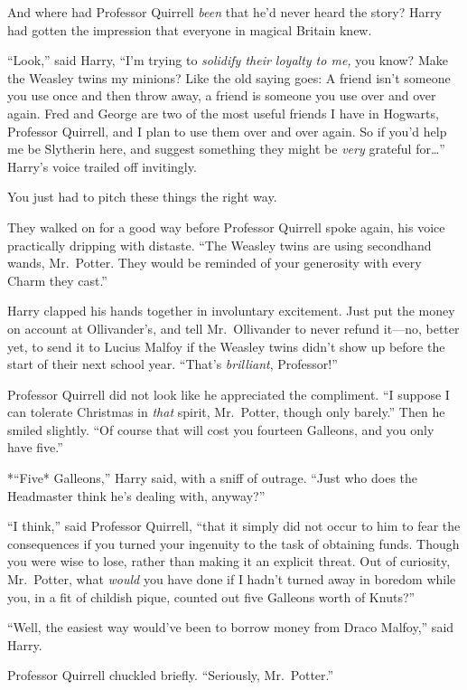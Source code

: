 And where had Professor Quirrell \emph{been} that he'd never heard the
story? Harry had gotten the impression that everyone in magical Britain
knew.

``Look,'' said Harry, ``I'm trying to \emph{solidify their loyalty to
me,} you know? Make the Weasley twins my minions? Like the old saying
goes: A friend isn't someone you use once and then throw away, a friend
is someone you use over and over again. Fred and George are two of the
most useful friends I have in Hogwarts, Professor Quirrell, and I plan
to use them over and over again. So if you'd help me be Slytherin here,
and suggest something they might be \emph{very} grateful for\ldots{}''
Harry's voice trailed off invitingly.

You just had to pitch these things the right way.

They walked on for a good way before Professor Quirrell spoke again, his
voice practically dripping with distaste. ``The Weasley twins are using
secondhand wands, Mr.~Potter. They would be reminded of your generosity
with every Charm they cast.''

Harry clapped his hands together in involuntary excitement. Just put the
money on account at Ollivander's, and tell Mr.~Ollivander to never
refund it---no, better yet, to send it to Lucius Malfoy if the Weasley
twins didn't show up before the start of their next school year.
``That's \emph{brilliant}, Professor!''

Professor Quirrell did not look like he appreciated the compliment. ``I
suppose I can tolerate Christmas in \emph{that} spirit, Mr.~Potter,
though only barely.'' Then he smiled slightly. ``Of course that will
cost you fourteen Galleons, and you only have five.''

*``Five* Galleons,'' Harry said, with a sniff of outrage. ``Just who
does the Headmaster think he's dealing with, anyway?''

``I think,'' said Professor Quirrell, ``that it simply did not occur to
him to fear the consequences if you turned your ingenuity to the task of
obtaining funds. Though you were wise to lose, rather than making it an
explicit threat. Out of curiosity, Mr.~Potter, what \emph{would} you
have done if I hadn't turned away in boredom while you, in a fit of
childish pique, counted out five Galleons worth of Knuts?''

``Well, the easiest way would've been to borrow money from Draco
Malfoy,'' said Harry.

Professor Quirrell chuckled briefly. ``Seriously, Mr.~Potter.''

